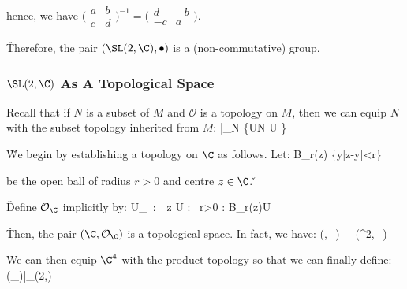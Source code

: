 hence, we have $\biggl(\begin{matrix} a & b \\ c & d \end{matrix}\biggr)^{-1}= \biggl(\begin{matrix} d & -b \\ -c & a
\end{matrix}\biggr)$.
\een

\v

Therefore, the pair $(\SL(2,\C),\bullet)$ is a (non-commutative) group.

\subsubsection*{$\SL(2,\C)$ As A Topological Space}

Recall that if $N$ is a subset of $M$ and $\mathcal{O}$ is a topology on $M$, then we can equip $N$ with the subset
topology inherited from $M$:
\bse
{}|_N \coloneqq \{U\cap N \mid U \in {}\}
\ese

\v

We begin by establishing a topology on $\C$ as follows. Let:
\bse
B_r(z) \coloneqq \{y\in\C\mid |z-y|<r\}
\ese

be the open ball of radius $r>0$ and centre $z\in \C$. \v

\begin{center}
\end{center}

\v

Define $\mathcal{O}_\C$ implicitly by:
\bse
U\in {}_\C\ :\Leftrightarrow\ \forall \, z \in U : \exists \, r>0 : B_r(z)\se U
\ese

\v

Then, the pair $(\C,\mathcal{O}_\C)$ is a topological space. In fact, we have:
\bse
(\C,_\C) \cong_ (\R^2,_)
\ese

We can then equip $\C^4$ with the product topology so that we can finally define:
\bse
{} \coloneqq (_\C)|_{\SL(2,\C)}
\ese

